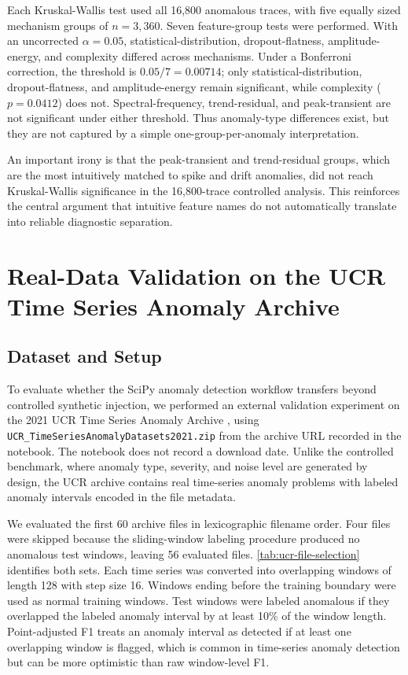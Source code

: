 Each Kruskal-Wallis test used all 16,800 anomalous traces, with five equally sized mechanism groups of \(n=3{,}360\). Seven feature-group tests were performed. With an uncorrected \(\alpha=0.05\), statistical-distribution, dropout-flatness, amplitude-energy, and complexity differed across mechanisms. Under a Bonferroni correction, the threshold is \(0.05/7=0.00714\); only statistical-distribution, dropout-flatness, and amplitude-energy remain significant, while complexity (\(p=0.0412\)) does not. Spectral-frequency, trend-residual, and peak-transient are not significant under either threshold. Thus anomaly-type differences exist, but they are not captured by a simple one-group-per-anomaly interpretation.

An important irony is that the peak-transient and trend-residual groups, which are the most intuitively matched to spike and drift anomalies, did not reach Kruskal-Wallis significance in the 16,800-trace controlled analysis. This reinforces the central argument that intuitive feature names do not automatically translate into reliable diagnostic separation.

\section{Real-Data Validation on the UCR Time Series Anomaly Archive}

\subsection{Dataset and Setup}

To evaluate whether the SciPy anomaly detection workflow transfers beyond controlled synthetic injection, we performed an external validation experiment on the 2021 UCR Time Series Anomaly Archive \citep{wu2021ucr}, using \texttt{UCR\_TimeSeriesAnomalyDatasets2021.zip} from the archive URL recorded in the notebook. The notebook does not record a download date. Unlike the controlled benchmark, where anomaly type, severity, and noise level are generated by design, the UCR archive contains real time-series anomaly problems with labeled anomaly intervals encoded in the file metadata.

We evaluated the first 60 archive files in lexicographic filename order. Four files were skipped because the sliding-window labeling procedure produced no anomalous test windows, leaving 56 evaluated files. \cref{tab:ucr-file-selection} identifies both sets. Each time series was converted into overlapping windows of length 128 with step size 16. Windows ending before the training boundary were used as normal training windows. Test windows were labeled anomalous if they overlapped the labeled anomaly interval by at least 10\% of the window length. Point-adjusted F1 treats an anomaly interval as detected if at least one overlapping window is flagged, which is common in time-series anomaly detection but can be more optimistic than raw window-level F1.

